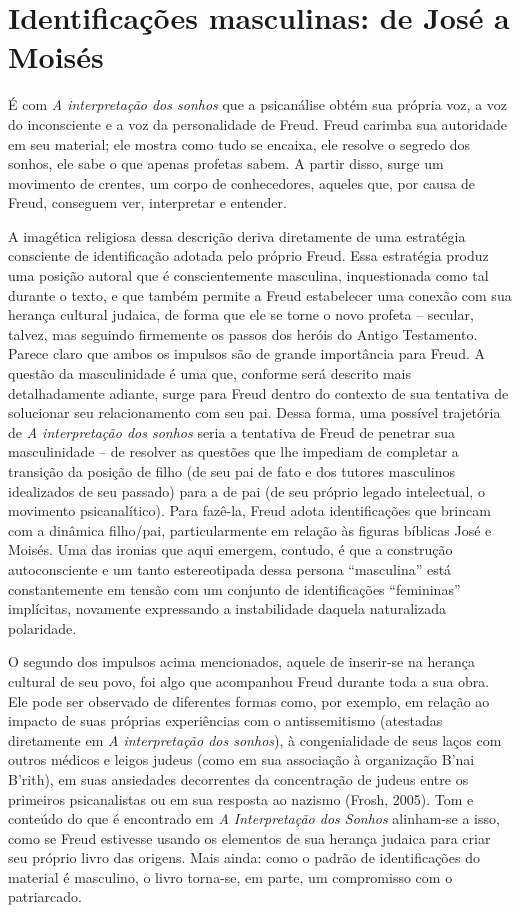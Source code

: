 \section{Identificações masculinas: de José a Moisés}

É com \emph{A interpretação dos sonhos} que a psicanálise obtém sua
própria voz, a voz do inconsciente e a voz da personalidade de Freud.
Freud carimba sua autoridade em seu material; ele mostra como tudo se
encaixa, ele resolve o segredo dos sonhos, ele sabe o que apenas
profetas sabem. A partir disso, surge um movimento de crentes, um corpo
de conhecedores, aqueles que, por causa de Freud, conseguem ver,
interpretar e entender.

A imagética religiosa dessa descrição deriva diretamente de uma
estratégia consciente de identificação adotada pelo próprio Freud. Essa
estratégia produz uma posição autoral que é conscientemente masculina,
inquestionada como tal durante o texto, e que também permite a Freud
estabelecer uma conexão com sua herança cultural judaica, de forma que
ele se torne o novo profeta -- secular, talvez, mas seguindo firmemente
os passos dos heróis do Antigo Testamento. Parece claro que ambos os
impulsos são de grande importância para Freud. A questão da
masculinidade é uma que, conforme será descrito mais detalhadamente
adiante, surge para Freud dentro do contexto de sua tentativa de
solucionar seu relacionamento com seu pai. Dessa forma, uma possível
trajetória de \emph{A interpretação dos sonhos} seria a tentativa de
Freud de penetrar sua masculinidade -- de resolver as questões que lhe
impediam de completar a transição da posição de filho (de seu pai de
fato e dos tutores masculinos idealizados de seu passado) para a de pai
(de seu próprio legado intelectual, o movimento psicanalítico). Para
fazê-la, Freud adota identificações que brincam com a dinâmica
filho/pai, particularmente em relação às figuras bíblicas José e Moisés.
Uma das ironias que aqui emergem, contudo, é que a construção
autoconsciente e um tanto estereotipada dessa persona ``masculina'' está
constantemente em tensão com um conjunto de identificações ``femininas''
implícitas, novamente expressando a instabilidade daquela naturalizada
polaridade.

O segundo dos impulsos acima mencionados, aquele de inserir-se na
herança cultural de seu povo, foi algo que acompanhou Freud durante toda
a sua obra. Ele pode ser observado de diferentes formas como, por
exemplo, em relação ao impacto de suas próprias experiências com o
antissemitismo (atestadas diretamente em \emph{A interpretação dos
sonhos}), à congenialidade de seus laços com outros médicos e leigos
judeus (como em sua associação à organização B'nai B'rith), em suas
ansiedades decorrentes da concentração de judeus entre os primeiros
psicanalistas ou em sua resposta ao nazismo (Frosh, 2005). Tom e
conteúdo do que é encontrado em \emph{A Interpretação dos Sonhos}
alinham-se a isso, como se Freud estivesse usando os elementos de sua
herança judaica para criar seu próprio livro das origens. Mais ainda:
como o padrão de identificações do material é masculino, o livro
torna-se, em parte, um compromisso com o patriarcado.

